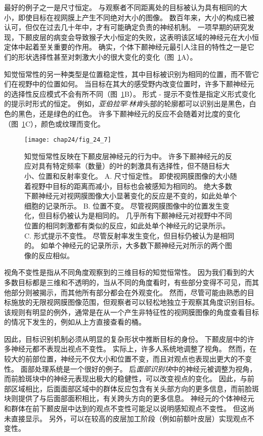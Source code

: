 最好的例子之一是尺寸恒定。
与观察者不同距离处的目标被认为具有相同的大小，即使目标在视网膜上产生不同绝对大小的图像。
数百年来，大小的构成已被认可，但仅在过去几十年中，才有可能确定负责的神经机制。
一项早期的研究发现，下颞皮层的病变会导致猴子大小恒定的失败，这表明该区域的神经元在大小恒定体中起着至关重要的作用。
确实，个体下颞神经元最引人注目的特性之一是它们的形状选择性甚至对刺激大小的很大变化的变化（图~\ref{fig:24_7}A）。


知觉恒常性的另一种类型是位置稳定性，其中目标被识别为相同的位置，而不管它们在视野中的位置如何。
当目标在其大的感受野内改变位置时，许多下颞神经元的选择性反应模式不会有所不同（图~\ref{fig:24_7}B）。
形式 - 提示不变性是指定义形式变化的提示时形式的恒定。
例如，\textit{亚伯拉罕$\cdot$林肯}头部的轮廓都可以识别出是黑色，白色的黑色，还是绿色的红色。 
许多下颞神经元的反应不会随着对比度的变化（图~\ref{fig:24_7}C），颜色或纹理而变化。


\begin{figure}[htbp]
	\centering
	\texttt{[image: chap24/fig\_24\_7]}
	\caption{知觉恒常性反映在下颞皮层神经元的行为中。
		许多下颞神经元的反应对具有特定频率（数量）的叶的刺激具有选择性，但不随目标大小、位置和反射率变化。
		A. 尺寸恒定性。
		即使视网膜图像的大小随着视野中目标的距离而减小，目标也会被感知为相同的。
		绝大多数下颞神经元对视网膜图像大小显著变化的反应是不变的，如此处单个细胞的记录所示。
		B. 位置不变。
		尽管视网膜图像中的位置发生变化，但目标仍被认为是相同的。
		几乎所有下颞神经元对视野中不同位置的相同刺激都有类似的反应，如此处单个神经元的记录所示。
		C. 形式提示不变性。
		尽管反射率发生变化，但目标仍被认为是相同的。
		如单个神经元的记录所示，大多数下颞神经元对所示的两个图像的反应相似。}
	\label{fig:24_7}
\end{figure}


视角不变性是指从不同角度观察到的三维目标的知觉恒常性。
因为我们看到的大多数目标都是三维和不透明的，当从不同的角度看时，有些部分变得不可见，而其他部分则被揭示，而其他所有部分都会在外观变化。
然而，尽管可能由熟悉的目标施放的无限视网膜图像范围，但观察者可以轻松地独立于观察其角度识别目标。
该规则有明显的例外，通常是在从一个产生非特征性的视网膜图像的角度查看目标的情况下发生的，例如从上方直接查看的桶。


因此，目标识别机制必须从明显的复杂形状中推断目标的身份。
下颞皮层中的许多神经元都不表现出视点不变性。
实际上，许多人系统地调整了视角。
然而，在较大的前部位置，神经元不仅大小和位置不变，而且对观点也表现出更大的不变性。
面部处理系统是一个很好的例子。
后\textit{面部识别块}中的神经元被调整为视角，而前脸斑块中的神经元表现出极大的稳健性，可以改变视点的变化。
因此，与前部区域相比，后面面部区域中的群体反应包含有关头部方向的更多信息，而前脸斑块则提供了与后面部面积相比，有关跨头方向的更多信息。
神经元的个体神经元和群体在前下颞皮层中达到的观点不变性可能足以说明感知观点不变性。
但这尚未直接显示。
另外，可以在较高的皮层加工阶段（例如前额叶皮层）实现观点不变性。


